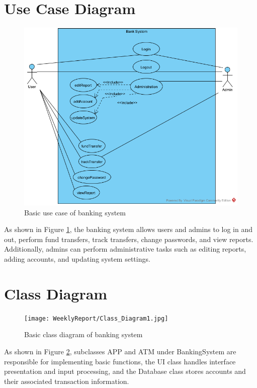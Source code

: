 \documentclass[12pt]{article}
\begin{document}
\newpage 
\section{Use Case Diagram}
\begin{figure}[h]
    \centering
    \includegraphics[width=\linewidth]{WeeklyReport/BankSysUseCase.png}
    \caption{Basic use case of banking system }
    \label{fig:usecase}
\end{figure}

As shown in Figure \ref{fig:usecase}, the banking system allows users and admins to log in and out, perform fund transfers, track transfers, change passwords, and view reports. Additionally, admins can perform administrative tasks such as editing reports, adding accounts, and updating system settings.

\newpage
\section{Class Diagram}

\begin{figure}[h]
    \centering
    \texttt{[image: WeeklyReport/Class\_Diagram1.jpg]}
    \caption{Basic class diagram of banking system }
    \label{fig:classdiagram}
\end{figure}

As shown in Figure \ref{fig:classdiagram}, subclasses APP and ATM under BankingSystem are responsible for implementing basic functions, the UI class handles interface presentation and input processing, and the Database class stores accounts and their associated transaction information.
\newpage
\end{document}
